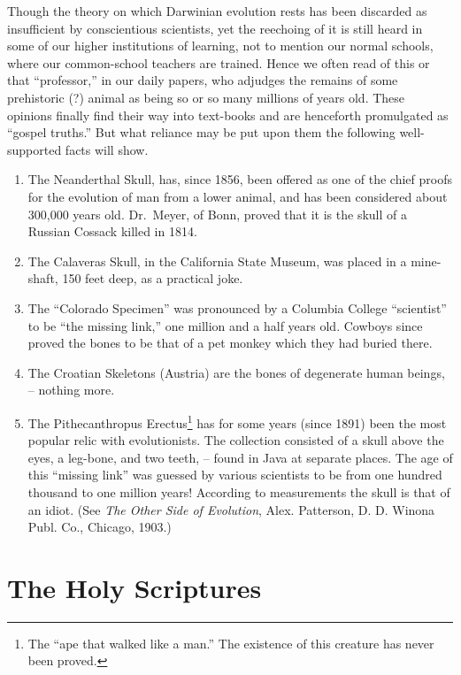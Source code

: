 \documentclass[
]{book}
\begin{document}
Though the theory on which Darwinian evolution rests has been discarded as insufficient by conscientious scientists, yet the reechoing of it is still heard in some of our higher institutions of learning, not to mention our normal schools, where our common-school teachers are trained. Hence we often read of this or that ``professor,'' in our daily papers, who adjudges the remains of some prehistoric (?) animal as being so or so many millions of years old. These opinions finally find their way into text-books and are henceforth promulgated as ``gospel truths.'' But what reliance may be put upon them the following well-supported facts will show.

\begin{enumerate}
\def\labelenumi{\arabic{enumi}.}
\item
  The Neanderthal Skull, has, since 1856, been offered as one of the chief proofs for the evolution of man from a lower animal, and has been considered about 300,000 years old. Dr.~Meyer, of Bonn, proved that it is the skull of a Russian Cossack killed in 1814.
\item
  The Calaveras Skull, in the California State Museum, was placed in a mine-shaft, 150 feet deep, as a practical joke.
\item
  The ``Colorado Specimen'' was pronounced by a Columbia College ``scientist'' to be ``the missing link,'' one million and a half years old. Cowboys since proved the bones to be that of a pet monkey which they had buried there.
\item
  The Croatian Skeletons (Austria) are the bones of degenerate human beings, -- nothing more.
\item
  The Pithecanthropus Erectus\footnote{The ``ape that walked like a man.'' The existence of this creature has never been proved.} has for some years (since 1891) been the most popular relic with evolutionists. The collection consisted of a skull above the eyes, a leg-bone, and two teeth, -- found in Java at separate places. The age of this ``missing link'' was guessed by various scientists to be from one hundred thousand to one million years! According to measurements the skull is that of an idiot. (See \emph{The Other Side of Evolution}, Alex. Patterson, D. D. Winona Publ. Co., Chicago, 1903.)
\end{enumerate}

\section*{\texorpdfstring{The Holy Scriptures}{The Holy Scriptures}}\label{the-holy-scriptures}
\end{document}
